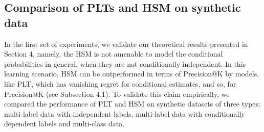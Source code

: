 \documentclass{article}
\newcommand{\Algo}[1]{\textsc{#1}}
\begin{document}
{%

\subsection{Comparison of PLTs and HSM on synthetic data}
\label{sec:empirical-synthetic}




In the first set of experiments, we validate our theoretical results presented in Section 4, namely, the \Algo{HSM} is not amenable to model the conditional probabilities in general, when they are not conditionally independent. In this learning scenario, \Algo{HSM} can be outperformed in terms of Precision@K by models, like \Algo{PLT}, which has vanishing regret for conditional estimates, and so, for Precision@K (see Subsection 4.1). To validate this claim empirically, we compared the performance of \Algo{PLT} and \Algo{HSM} on synthetic datasets of three types: multi-label data with independent labels, multi-label data with conditionally dependent labels and multi-class data. 



}
\end{document}
